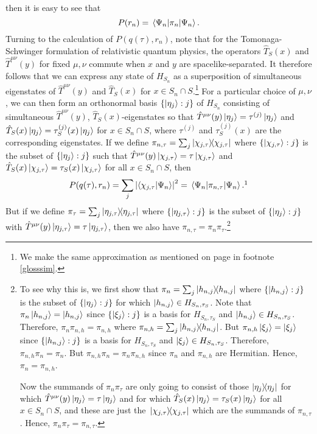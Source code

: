 then it is easy to see that
$$P(r_n)=\ev*{\pi_n}{\Psi_n}.$$
Turning to the calculation of $P(q(\tau), r_n)$, note that for the Tomonaga-Schwinger formulation of relativistic quantum physics, the operators $\hat{T}_S(x)$ and $\hat{T}^{\mu\nu}(y)$ for fixed $\mu,\nu$ commute when $x$ and $y$ are spacelike-separated. It therefore follows that we can express any state of $H_{S_n}$ as a superposition of simultaneous eigenstates of $\hat{T}^{\mu\nu}(y)$ and $\hat{T}_S(x)$ for $x\in S_n\cap S$.\footnote{We make the same approximation as mentioned on page \pageref{simultaneous} in footnote \ref{glosssim}.}  For a particular choice of $\mu,\nu$, we can then form an orthonormal basis $\{\ket{\eta_j}:j\}$ of $H_{S_n}$ consisting of simultaneous $\hat{T}^{\mu\nu}(y)$, $\hat{T}_S(x)$-eigenstates so that $\hat{T}^{\mu\nu}(y)\ket{\eta_j}=\tau^{(j)}\ket{\eta_j}$ and $\hat{T}_{S}(x)\ket{\eta_j}=\tau_S^{(j)}(x)\ket{\eta_j}$ for $x\in S_n\cap S$, where $\tau^{(j)}$ and $\tau_S^{(j)}(x)$ are the corresponding eigenstates. If we define  $\pi_{n,\tau}=\sum_j\dyad{\chi_{j,\tau}}$ where $\{\ket{\chi_{j,\tau}}:j\}$ is the subset of $\{\ket{\eta_j}:j\}$ such that $\hat{T}^{\mu\nu}(y)\ket{\chi_{j,\tau}}=\tau\ket{\chi_{j,\tau}}$ and $\hat{T}_S(x)\ket{\chi_{j,\tau}}=\tau_S(x)\ket{\chi_{j,\tau}}$ for all $x\in S_n\cap S$, then 
\begin{equation}\label{pqtauri}
P(q(\tau), r_n)=\sum_j \abs{ \ip{\chi_{j,\tau}}{\Psi_n}}^2=\ev*{\pi_{n,\tau}}{\Psi_n}.\protect\footnotemark
\end{equation}
But if we define $\pi_\tau=\sum_j\dyad{\eta_{j,\tau}}$ where $\{\ket{\eta_{j,\tau}}:j\}$ is the subset of  $\{\ket{\eta_j}:j\}$ with $\hat{T}^{\mu\nu}(y)\ket{\eta_{j,\tau}}=\tau\ket{\eta_{j,\tau}}$, then we also have  $\pi_{n,\tau}=\pi_n\pi_\tau$.\footnote{To see why this is, 
we first show that $\pi_n=\sum_j\dyad{h_{n,j}}$ where $\{\ket{h_{n,j}}:j\}$ is the subset of $\{\ket{\eta_j}:j\}$  for which $\ket{h_{n,j}}\in H_{S_n,\tau_S}$. 
Note that $\pi_n\ket{h_{n,j}}=\ket{h_{n,j}}$    since $\{\ket{\xi_j}:j\}$ is a basis for $H_{S_n,\tau_S}$ and $\ket{h_{n,j}}\in H_{S_n,\tau_S}$. 
Therefore, $\pi_n\pi_{n,h}=\pi_{n,h}$  where  $\pi_{n,h}=\sum_j\dyad{h_{n,j}}$. 
But  $\pi_{n,h}\ket{\xi_j}=\ket{\xi_j}$ since $\{\ket{h_{n,j}}:j\}$ is a basis for $H_{S_n,\tau_S}$ and $\ket{\xi_j}\in H_{S_n,\tau_S}$. 
Therefore, $\pi_{n,h}\pi_n=\pi_n.$ But $\pi_{n,h}\pi_n= \pi_n\pi_{n,h}$ since $\pi_n$ and $\pi_{n,h}$ are Hermitian. Hence, $\pi_n= \pi_{n,h}$.

Now the summands of $\pi_n\pi_\tau$ are only going to consist of those $\dyad{\eta_j}$ for which $\hat{T}^{\mu\nu}(y)\ket{\eta_j}=\tau\ket{\eta_j}$ and for which $\hat{T}_S(x)\ket{\eta_j}=\tau_S(x)\ket{\eta_j}$ for all $x\in S_n\cap S$, and these are just the $\dyad*{\chi_{j,\tau}}$ which are the summands of  $\pi_{n,\tau}$. Hence,  $\pi_n\pi_\tau=\pi_{n,\tau}.$} 
